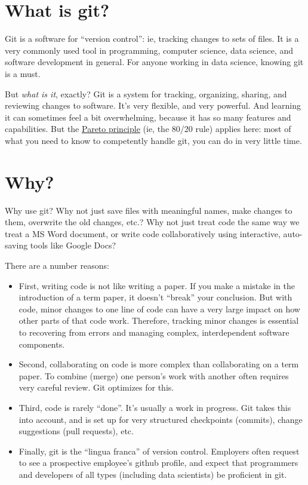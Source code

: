 \documentclass[
]{book}
\providecommand{\tightlist}{%
  \setlength{\itemsep}{0pt}\setlength{\parskip}{0pt}}
\begin{document}
\hypertarget{what-is-git}{%
\section*{What is git?}\label{what-is-git}}

Git is a software for ``version control'': ie, tracking changes to sets of files. It is a very commonly used tool in programming, computer science, data science, and software development in general. For anyone working in data science, knowing git is a must.

But \emph{what is it}, exactly? Git is a system for tracking, organizing, sharing, and reviewing changes to software. It's very flexible, and very powerful. And learning it can sometimes feel a bit overwhelming, because it has so many features and capabilities. But the \href{https://en.wikipedia.org/wiki/Pareto_principle}{Pareto principle} (ie, the 80/20 rule) applies here: most of what you need to know to competently handle git, you can do in very little time.

\hypertarget{why-1}{%
\section*{Why?}\label{why-1}}

Why use git? Why not just save files with meaningful names, make changes to them, overwrite the old changes, etc.? Why not just treat code the same way we treat a MS Word document, or write code collaboratively using interactive, auto-saving tools like Google Docs?

There are a number reasons:

\begin{itemize}
\tightlist
\item
  First, writing code is not like writing a paper. If you make a mistake in the introduction of a term paper, it doesn't ``break'' your conclusion. But with code, minor changes to one line of code can have a very large impact on how other parts of that code work. Therefore, tracking minor changes is essential to recovering from errors and managing complex, interdependent software components.\\
\item
  Second, collaborating on code is more complex than collaborating on a term paper. To combine (merge) one person's work with another often requires very careful review. Git optimizes for this.\\
\item
  Third, code is rarely ``done''. It's usually a work in progress. Git takes this into account, and is set up for very structured checkpoints (commits), change suggestions (pull requests), etc.
\item
  Finally, git is the ``lingua franca'' of version control. Employers often request to see a prospective employee's github profile, and expect that programmers and developers of all types (including data scientists) be proficient in git.
\end{itemize}
\end{document}
